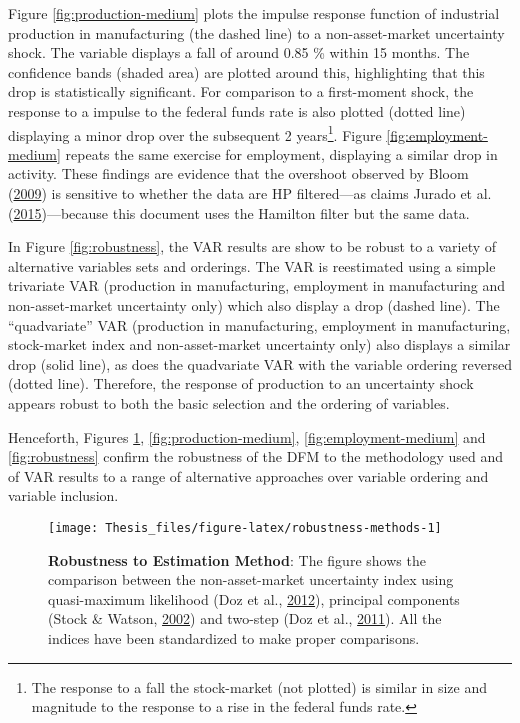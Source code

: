 \documentclass[12pt,twoside]{reedthesis}
\begin{document}
Figure \ref{fig:production-medium} plots the impulse response function of industrial production in manufacturing (the dashed line) to a non-asset-market uncertainty shock. The variable displays a fall of around 0.85 \% within 15 months. The confidence bands (shaded area) are plotted around this, highlighting that this drop is statistically significant. For comparison to a first-moment shock, the response to a impulse to the federal funds rate is also plotted (dotted line) displaying a minor drop over the subsequent 2 years\footnote{The response to a fall the stock-market (not plotted) is similar in size and magnitude to the response to a rise in the federal funds rate.}. Figure \ref{fig:employment-medium} repeats the same exercise for employment, displaying a similar drop in activity. These findings are evidence that the overshoot observed by Bloom (\protect\hyperlink{ref-bloom:2009}{2009}) is sensitive to whether the data are HP filtered---as claims Jurado et al. (\protect\hyperlink{ref-juraetal:2015}{2015})---because this document uses the Hamilton filter but the same data.

In Figure \ref{fig:robustness}, the VAR results are show to be robust to a variety of alternative variables sets and orderings. The VAR is reestimated using a simple trivariate VAR (production in manufacturing, employment in manufacturing and non-asset-market uncertainty only) which also display a drop (dashed line). The ``quadvariate'' VAR (production in manufacturing, employment in manufacturing, stock-market index and non-asset-market uncertainty only) also displays a similar drop (solid line), as does the quadvariate VAR with the variable ordering reversed (dotted line). Therefore, the response of production to an uncertainty shock appears robust to both the basic selection and the ordering of variables.

Henceforth, Figures \ref{fig:robustness-methods}, \ref{fig:production-medium}, \ref{fig:employment-medium} and \ref{fig:robustness} confirm the robustness of the DFM to the methodology used and of VAR results to a range of alternative approaches over variable ordering and variable inclusion.


\begin{figure}

{\centering \texttt{[image: Thesis\_files/figure-latex/robustness-methods-1]} 

}

\caption[Robustness to Estimation Method]{\textbf{Robustness to Estimation Method}: The figure shows the comparison between the non-asset-market uncertainty index using quasi-maximum likelihood (Doz et al., \protect\hyperlink{ref-dozetal:2012}{2012}), principal components (Stock \& Watson, \protect\hyperlink{ref-stocwats:2002}{2002}) and two-step (Doz et al., \protect\hyperlink{ref-dozetal:2011}{2011}). All the indices have been standardized to make proper comparisons.}\label{fig:robustness-methods}
\end{figure}
\end{document}
